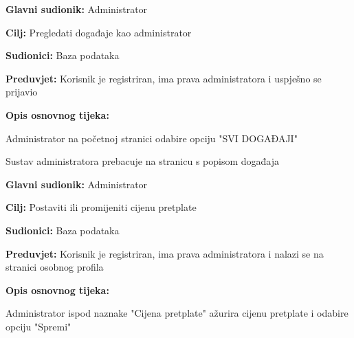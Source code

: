 \noindent {}
\begin{packed_item}
	\item \textbf{Glavni sudionik:} Administrator
	\item  \textbf{Cilj:} Pregledati događaje kao administrator
	\item  \textbf{Sudionici:} Baza podataka
	\item  \textbf{Preduvjet:} Korisnik je registriran, ima prava administratora i uspješno se prijavio
	\item  \textbf{Opis osnovnog tijeka:}
	
	\item[] \begin{packed_enum}
		
		\item Administrator na početnoj stranici odabire opciju "SVI DOGAĐAJI"
		\item Sustav administratora prebacuje na stranicu s popisom događaja
	\end{packed_enum}
	
\end{packed_item}


\noindent {}
\begin{packed_item}
	\item \textbf{Glavni sudionik:} Administrator
	\item  \textbf{Cilj:} Postaviti ili promijeniti cijenu pretplate 
	\item  \textbf{Sudionici:} Baza podataka
	\item  \textbf{Preduvjet:} Korisnik je registriran, ima prava administratora i nalazi se na stranici osobnog profila
	\item  \textbf{Opis osnovnog tijeka:}
	
	\item[] \begin{packed_enum}
		
		\item Administrator ispod naznake "Cijena pretplate" ažurira cijenu pretplate i odabire opciju "Spremi"

	\end{packed_enum}
	
\end{packed_item}


